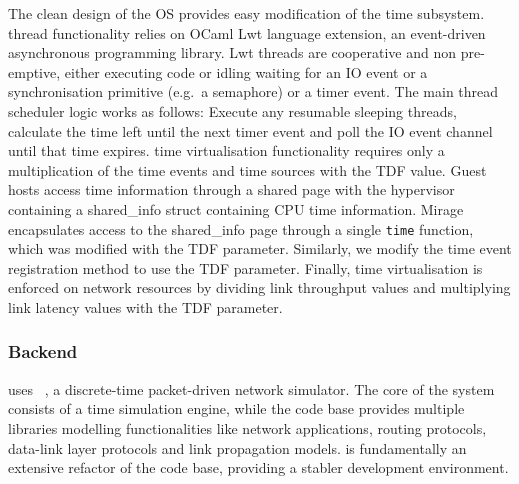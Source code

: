 The clean design of the \mirage OS provides easy modification of the time
subsystem. \mirage thread functionality relies on OCaml Lwt language extension,
an event-driven asynchronous programming library.  Lwt threads are cooperative
and non pre-emptive, either executing code or idling waiting for an IO event or a
synchronisation primitive (e.g.~a semaphore) or a timer event. The main thread
scheduler logic works as follows: Execute any resumable sleeping threads,
calculate the time left until the next timer event and poll the IO event channel
until that time expires. \sdnsim time virtualisation functionality requires only
a multiplication of the time events and time sources with the TDF value.  Guest
hosts access time information through a shared page with the hypervisor
containing a shared\_info struct containing CPU time information. Mirage
encapsulates access to the shared\_info page through a single \texttt{time}
function, which was modified with the TDF parameter. Similarly, we modify the
time event registration method to use the TDF parameter. Finally, time
virtualisation is enforced on network resources by dividing link throughput
values and multiplying link latency values with the TDF parameter. 

\subsubsection{ Backend}

\sdnsim uses ~, a discrete-time packet-driven network
simulator. The core of the system consists
of a time simulation engine, while the code base provides multiple libraries
modelling functionalities like network applications, routing protocols,
data-link layer protocols and link propagation models.  is fundamentally
an extensive refactor of the  code base, providing a stabler development
environment. 

